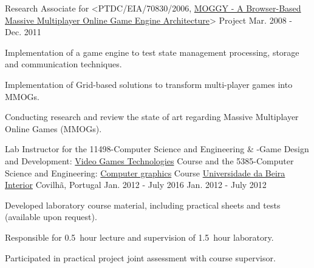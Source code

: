 \begin{cventries}
  \cventry
    {Research Associate for <PTDC/EIA/70830/2006, \href{http://www.di.ubi.pt/~agomes/moggy/index.html}{MOGGY - A Browser-Based Massive Multiplayer Online Game Engine Architecture}> Project} %
    {} %
    {} %
    {Mar. 2008 - Dec. 2011} %
    {
      \begin{cvitems} %
		\item {Implementation of a game engine to test state management processing, storage and communication techniques.}        
        \item {Implementation of Grid-based solutions to transform multi-player games into MMOGs.}
        \item {Conducting research and review the state of art regarding Massive Multiplayer Online Games (MMOGs).}
      \end{cvitems}
    }     
    
  \cventry
    {Lab Instructor for the
        11498-Computer Science and Engineering \& -Game Design and Development: 
		\href{http://www.di.ubi.pt/~agomes/tjv/}{Video Games Technologies}	Course 
		\linebreak and the
		5385-Computer Science and Engineering: 		
		\href{http://www.di.ubi.pt/~agomes/cg/}{Computer graphics} Course} %
    {\href{http://www.ubi.pt}{Universidade da Beira Interior}} %
    {Covilh\~a, Portugal} %
    {\linebreak Jan. 2012 - July 2016 \linebreak Jan. 2012 - July 2012} %
    {
      \begin{cvitems} %
		\item {Developed laboratory course material, including practical sheets and tests (available upon request).}
        \item {Responsible for 0.5~hour lecture and supervision of 1.5~hour laboratory.} 
        \item {Participated in practical project joint assessment with course supervisor.}					
      \end{cvitems}
    }       
    

\end{cventries}
